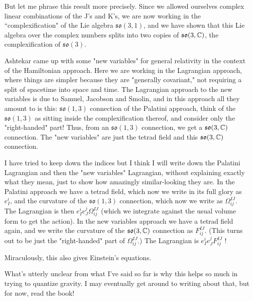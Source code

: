 But let me phrase this result more precisely. Since we allowed ourselves complex linear combinations of the J's and K's, we are now working in the ``complexification" of the Lie algebra $\mathfrak{so}(3,1)$, and we have shown that this Lie algebra over the complex numbers splits into two copies of $\mathfrak{so}(3,\mathbb C)$, the complexification of $\mathfrak{so}(3)$.

Ashtekar came up with some "new variables" for general relativity in the context of the Hamiltonian approach. Here we are working in the Lagrangian approach, where things are simpler because they are "generally covariant," not requiring a split of spacetime into space and time. The Lagrangian approach to the new variables is due to Samuel, Jacobson and Smolin, and in this approach all they amount to is this: $\mathfrak{so}(1,3)$ connection of the Palatini approach, think of the$\mathfrak{so}(1,3)$ as sitting inside the complexification thereof, and consider only the "right-handed" part! Thus, from an $\mathfrak{so}(1,3)$ connection, we get a $\mathfrak{so}(3,\mathbb C)$ connection. The "new variables" are just the tetrad field and this $\mathfrak{so}(3,\mathbb C)$ connection.

I have tried to keep down the indices but I think I will write down the Palatini Lagrangian and then the "new variables" Lagrangian, without explaining exactly what they mean, just to show how amazingly similar-looking they are. In the Palatini approach we have a tetrad field, which now we write in its full glory as $e_I^i$, and the curvature of the $\mathfrak{so}(1,3)$ connection, which now we write as $\Omega_{ij}^{IJ}$. The Lagrangian is then
$e_I^i e_J^j \Omega_{ij}^{IJ}$
(which we integrate against the usual volume form to get the action). In the new variables approach we have a tetrad field again, and we write the curvature of the $\mathfrak{so}(3,\mathbb C)$  connection as $F_{ij}^{IJ}$. (This turns out to be just the "right-handed" part of  $\Omega_{ij}^{IJ}$.) The Lagrangian is
$e_I^i e_J^j F_{ij}^{IJ}$ !

Miraculously, this also gives Einstein's equations.

What's utterly unclear from what I've said so far is why this helps so much in trying to quantize gravity. I may eventually get around to writing about that, but for now, read the book!


